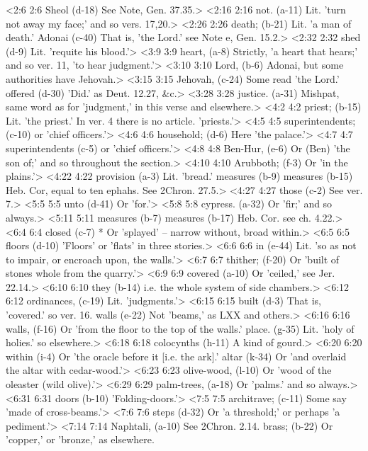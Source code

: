 <2:6 2:6  Sheol (d-18)  See Note, Gen. 37.35.>
<2:16 2:16  not. (a-11)  Lit. 'turn not away my face;' and so vers. 17,20.>
<2:26 2:26  death; (b-21)  Lit. 'a man of death.'
  Adonai (c-40)  That is, 'the Lord.' see Note e, Gen. 15.2.>
<2:32 2:32  shed (d-9)  Lit. 'requite his blood.'>
<3:9 3:9  heart, (a-8)  Strictly, 'a heart that hears;' and so ver. 11, 'to hear  judgment.'>
<3:10 3:10  Lord, (b-6)  Adonai, but some authorities have Jehovah.>
<3:15 3:15  Jehovah, (c-24)  Some read 'the Lord.'
  offered (d-30)  'Did.' as Deut. 12.27, &c.>
<3:28 3:28  justice. (a-31)  Mishpat, same word as for 'judgment,' in this verse and  elsewhere.>
<4:2 4:2  priest; (b-15)  Lit. 'the priest.' In ver. 4 there is no article.  'priests.'>
<4:5 4:5  superintendents; (c-10) or 'chief officers.'>
<4:6 4:6  household; (d-6)  Here 'the palace.'>
<4:7 4:7  superintendents (c-5)  or 'chief officers.'>
<4:8 4:8  Ben-Hur, (e-6)  Or (Ben) 'the son of;' and so throughout the section.>
<4:10 4:10  Arubboth; (f-3)  Or 'in the plains.'>
<4:22 4:22  provision (a-3)  Lit. 'bread.'
  measures (b-9)  measures (b-15)
  Heb. Cor, equal to ten ephahs. See 2Chron. 27.5.>
<4:27 4:27  those (c-2)  See ver. 7.>
<5:5 5:5  unto (d-41)  Or 'for.'>
<5:8 5:8  cypress. (a-32)  Or 'fir;' and so always.>
<5:11 5:11  measures (b-7)  measures (b-17)
  Heb. Cor. see ch. 4.22.>
<6:4 6:4  closed (c-7)  * Or 'splayed' -- narrow without, broad within.>
<6:5 6:5  floors (d-10)  'Floors' or 'flats' in three stories.>
<6:6 6:6  in (e-44)  Lit. 'so as not to impair, or encroach upon, the walls.'>
<6:7 6:7  thither; (f-20)  Or 'built of stones whole from the quarry.'>
<6:9 6:9  covered (a-10)  Or 'ceiled,' see Jer. 22.14.>
<6:10 6:10  they (b-14)  i.e. the whole system of side chambers.>
<6:12 6:12  ordinances, (c-19)  Lit. 'judgments.'>
<6:15 6:15  built (d-3)  That is, 'covered.' so ver. 16.
  walls (e-22)  Not 'beams,' as LXX and others.>
<6:16 6:16  walls, (f-16)  Or 'from the floor to the top of the walls.'
  place. (g-35)  Lit. 'holy of holies.' so elsewhere.>
<6:18 6:18  colocynths (h-11)  A kind of gourd.>
<6:20 6:20  within (i-4)  Or 'the oracle before it [i.e. the ark].'
  altar (k-34)  Or 'and overlaid the altar with cedar-wood.'>
<6:23 6:23  olive-wood, (l-10)  Or 'wood of the oleaster (wild olive).'>
<6:29 6:29  palm-trees, (a-18)  Or 'palms.' and so always.>
<6:31 6:31  doors (b-10)  'Folding-doors.'>
<7:5 7:5  architrave; (c-11)  Some say 'made of cross-beams.'>
<7:6 7:6  steps (d-32)  Or 'a threshold;' or perhaps 'a pediment.'>
<7:14 7:14  Naphtali, (a-10)  See 2Chron. 2.14.
  brass; (b-22)  Or 'copper,' or 'bronze,' as elsewhere.
